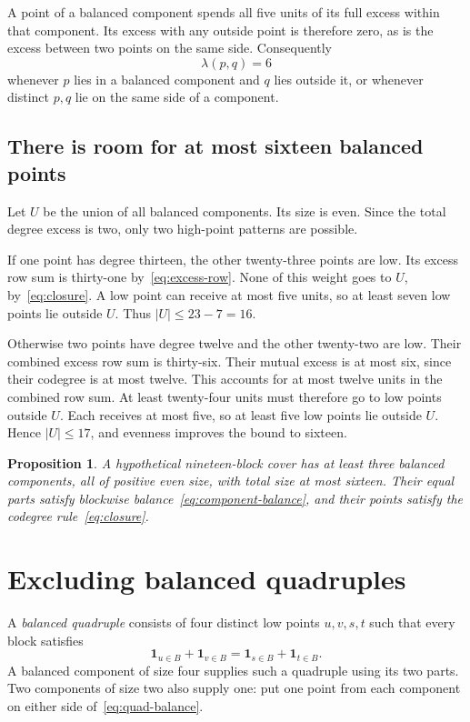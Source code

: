 \documentclass[11pt,letterpaper]{article}
\newtheorem{proposition}[theorem]{Proposition}
\theoremstyle{definition}\newtheorem{definition}[theorem]{Definition}
\theoremstyle{remark}\newtheorem{remark}[theorem]{Remark}
\newcommand{\one}{\mathbf 1}
\newcommand{\lam}{\lambda}
\begin{document}
A point of a balanced component spends all five units of its full excess within that component. Its excess with any outside point is therefore zero, as is the excess between two points on the same side. Consequently
\begin{equation}\label{eq:closure}
 \lam(p,q)=6
\end{equation}
whenever $p$ lies in a balanced component and $q$ lies outside it, or whenever distinct $p,q$ lie on the same side of a component.

\subsection{There is room for at most sixteen balanced points}
Let $U$ be the union of all balanced components. Its size is even. Since the total degree excess is two, only two high-point patterns are possible.

If one point has degree thirteen, the other twenty-three points are low. Its excess row sum is thirty-one by~\eqref{eq:excess-row}. None of this weight goes to $U$, by~\eqref{eq:closure}. A low point can receive at most five units, so at least seven low points lie outside $U$. Thus $|U|\le23-7=16$.

Otherwise two points have degree twelve and the other twenty-two are low. Their combined excess row sum is thirty-six. Their mutual excess is at most six, since their codegree is at most twelve. This accounts for at most twelve units in the combined row sum. At least twenty-four units must therefore go to low points outside $U$. Each receives at most five, so at least five low points lie outside $U$. Hence $|U|\le17$, and evenness improves the bound to sixteen.

\begin{proposition}\label{prop:components}
A hypothetical nineteen-block cover has at least three balanced components, all of positive even size, with total size at most sixteen. Their equal parts satisfy blockwise balance~\eqref{eq:component-balance}, and their points satisfy the codegree rule~\eqref{eq:closure}.
\end{proposition}

\section{Excluding balanced quadruples}\label{sec:quadruple}
A \emph{balanced quadruple} consists of four distinct low points $u,v,s,t$ such that every block satisfies
\begin{equation}\label{eq:quad-balance}
 \one_{u\in B}+\one_{v\in B}=\one_{s\in B}+\one_{t\in B}.
\end{equation}
A balanced component of size four supplies such a quadruple using its two parts. Two components of size two also supply one: put one point from each component on either side of~\eqref{eq:quad-balance}.
\end{document}
